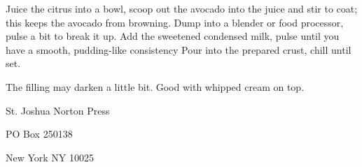 \documentclass[12pt]{article}
\begin{document}
Juice the citrus into a bowl, scoop out the avocado into the juice
and stir to coat; this keeps the avocado from browning. Dump into
a blender or food processor, pulse a bit to break it up. Add the
sweetened condensed milk, pulse until you have a smooth, pudding-like consistency
Pour into the prepared crust, chill until set. 

The filling may darken a little bit. Good with whipped cream
on top.

\newpage

\thispagestyle{empty}
\vspace*{12cm}
\begin{sideways}
\Large{St. Joshua Norton Press}
\end{sideways}
\begin{sideways}
\Large{PO Box 250138}
\end{sideways}
\begin{sideways}
\Large{New York NY 10025}
\end{sideways}
\end{document}
